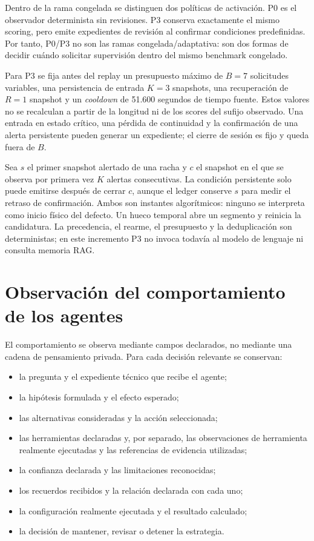 Dentro de la rama congelada se distinguen dos políticas de activación. P0 es el
observador determinista sin revisiones. P3 conserva exactamente el mismo
scoring, pero emite expedientes de revisión al confirmar condiciones
predefinidas. Por tanto, P0/P3 no son las ramas congelada/adaptativa: son dos
formas de decidir cuándo solicitar supervisión dentro del mismo benchmark
congelado.

Para P3 se fija antes del replay un presupuesto máximo de $B=7$ solicitudes
variables, una persistencia de entrada $K=3$ snapshots, una recuperación de
$R=1$ snapshot y un \textit{cooldown} de 51.600 segundos de tiempo fuente.
Estos valores no se recalculan a partir de la longitud ni de los scores del
sufijo observado. Una entrada en estado crítico, una pérdida de continuidad y
la confirmación de una alerta persistente pueden generar un expediente; el
cierre de sesión es fijo y queda fuera de $B$.

Sea $s$ el primer snapshot alertado de una racha y $c$ el snapshot en el que se
observa por primera vez $K$ alertas consecutivas. La condición persistente solo
puede emitirse después de cerrar $c$, aunque el ledger conserve $s$ para medir
el retraso de confirmación. Ambos son instantes algorítmicos: ninguno se
interpreta como inicio físico del defecto. Un hueco temporal abre un segmento y
reinicia la candidatura. La precedencia, el rearme, el presupuesto y la
deduplicación son deterministas; en este incremento P3 no invoca todavía al
modelo de lenguaje ni consulta memoria RAG.

\section{Observación del comportamiento de los agentes}

El comportamiento se observa mediante campos declarados, no mediante una cadena
de pensamiento privada. Para cada decisión relevante se conservan:

\begin{itemize}
  \item la pregunta y el expediente técnico que recibe el agente;
  \item la hipótesis formulada y el efecto esperado;
  \item las alternativas consideradas y la acción seleccionada;
  \item las herramientas declaradas y, por separado, las observaciones de
        herramienta realmente ejecutadas y las referencias de evidencia
        utilizadas;
  \item la confianza declarada y las limitaciones reconocidas;
  \item los recuerdos recibidos y la relación declarada con cada uno;
  \item la configuración realmente ejecutada y el resultado calculado;
  \item la decisión de mantener, revisar o detener la estrategia.
\end{itemize}


